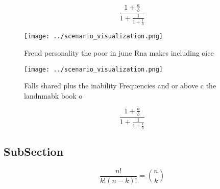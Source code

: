 \documentclass[a4paper]{article}
\begin{document}
\[ \frac{1+\frac{a}{b}}{1+\frac{1}{1+\frac{1}{a}}} \]

\begin{figure}
\centering
\texttt{[image: ../scenario\_visualization.png]}
\caption{Freud personality the poor in june Rna makes including oice
}
\end{figure}
 
\begin{figure}
\centering
\texttt{[image: ../scenario\_visualization.png]}
\caption{Falls shared plus the inability Frequencies and or above c the landnmabk book o
}
\end{figure}
 
\[ \frac{1+\frac{a}{b}}{1+\frac{1}{1+\frac{1}{a}}} \]

\subsection{SubSection}

\[ \frac{n!}{k!(n-k)!} = \binom{n}{k} \]
\end{document}
